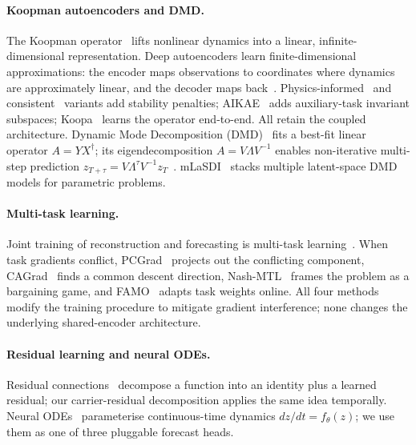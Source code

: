 \documentclass{article}
\begin{document}
\paragraph{Koopman autoencoders and DMD.}
The Koopman operator~\citep{koopman1931hamiltonian,mezic2005spectral}
lifts nonlinear dynamics into a linear, infinite-dimensional
representation.  Deep autoencoders learn finite-dimensional
approximations: the encoder maps observations to coordinates where
dynamics are approximately linear, and the decoder maps
back~\citep{lusch2018deep,takeishi2017learning,otto2019linearly,
yeung2019learning,champion2019data,gin2021deep}.
Physics-informed~\citep{erichson2019,pan2020physics} and
consistent~\citep{azencot2020} variants add stability penalties;
AIKAE~\citep{li2022deep} adds auxiliary-task invariant subspaces;
Koopa~\citep{liu2024koopa} learns the operator end-to-end.
All retain the coupled architecture.
Dynamic Mode Decomposition (DMD)~\citep{schmid2010dmd} fits a
best-fit linear operator $A = Y X^\dagger$; its eigendecomposition
$A = V\Lambda V^{-1}$ enables non-iterative multi-step prediction
$z_{T+\tau} = V\Lambda^\tau V^{-1} z_T$~\citep{brunton2022modern}.
mLaSDI~\citep{bonneville2024mlasdi} stacks multiple latent-space
DMD models for parametric problems.

\paragraph{Multi-task learning.}
Joint training of reconstruction and forecasting is multi-task
learning~\citep{sener2018multi}.  When task gradients conflict,
PCGrad~\citep{yu2020gradient} projects out the conflicting component,
CAGrad~\citep{liu2021conflict} finds a common descent direction,
Nash-MTL~\citep{navon2022multi} frames the problem as a bargaining
game, and FAMO~\citep{liu2024famo} adapts task weights online.
All four methods modify the training procedure to mitigate gradient
interference; none changes the underlying shared-encoder architecture.

\paragraph{Residual learning and neural ODEs.}
Residual connections~\citep{he2016deep} decompose a function into an
identity plus a learned residual; our carrier-residual decomposition
applies the same idea temporally.
Neural ODEs~\citep{chen2018neural,rubanova2019latent} parameterise
continuous-time dynamics $dz/dt = f_\theta(z)$; we use them as one of
three pluggable forecast heads.
\end{document}
